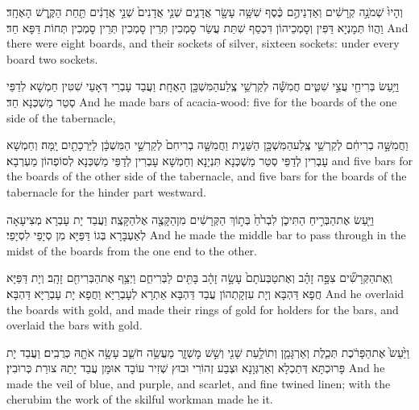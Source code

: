 {וְהָיוּ֙ שְׁמֹנָ֣ה קְרָשִׁ֔ים וְאַדְנֵיהֶ֣ם כֶּ֔סֶף שִׁשָּׁ֥ה עָשָׂ֖ר אֲדָנִ֑ים שְׁנֵ֤י אֲדָנִים֙ שְׁנֵ֣י אֲדָנִ֔ים תַּ֖חַת הַקֶּ֥רֶשׁ הָאֶחָֽד׃}
{וַהֲווֹ תְּמָנְיָא דַּפִּין וְסָמְכֵיהוֹן דִּכְסַף שִׁתַּת עֲשַׂר סָמְכִין תְּרֵין סָמְכִין תְּרֵין סָמְכִין תְּחוֹת דַּפָּא חַד׃}
{And there were eight boards, and their sockets of silver, sixteen sockets: under every board two sockets.}{}

{וַיַּ֥עַשׂ בְּרִיחֵ֖י עֲצֵ֣י שִׁטִּ֑ים חֲמִשָּׁ֕ה לְקַרְשֵׁ֥י צֶֽלַע\maqqaf הַמִּשְׁכָּ֖ן הָאֶחָֽת׃}
{וַעֲבַד עָבְרֵי דְּאָעֵי שִׁטִּין חַמְשָׁא לְדַפֵּי סְטַר מַשְׁכְּנָא חַד׃}
{And he made bars of acacia-wood: five for the boards of the one side of the tabernacle,}{}

{וַחֲמִשָּׁ֣ה בְרִיחִ֔ם לְקַרְשֵׁ֥י צֶֽלַע\maqqaf הַמִּשְׁכָּ֖ן הַשֵּׁנִ֑ית וַחֲמִשָּׁ֤ה בְרִיחִם֙ לְקַרְשֵׁ֣י הַמִּשְׁכָּ֔ן לַיַּרְכָתַ֖יִם יָֽמָּה׃}
{וְחַמְשָׁא עָבְרִין לְדַפֵּי סְטַר מַשְׁכְּנָא תִּנְיָנָא וְחַמְשָׁא עָבְרִין לְדַפֵּי מַשְׁכְּנָא לְסוֹפְהוֹן מַעְרְבָא׃}
{and five bars for the boards of the other side of the tabernacle, and five bars for the boards of the tabernacle for the hinder part westward.}{}

{וַיַּ֖עַשׂ אֶת\maqqaf הַבְּרִ֣יחַ הַתִּיכֹ֑ן לִבְרֹ֙חַ֙ בְּת֣וֹךְ הַקְּרָשִׁ֔ים מִן\maqqaf הַקָּצֶ֖ה אֶל\maqqaf הַקָּצֶֽה׃}
{וַעֲבַד יָת עָבְרָא מְצִיעָאָה לְאַעְבָּרָא בְּגוֹ דַּפַּיָּא מִן סְיָפֵי לִסְיָפֵי׃}
{And he made the middle bar to pass through in the midst of the boards from the one end to the other.}{}

{וְֽאֶת\maqqaf הַקְּרָשִׁ֞ים צִפָּ֣ה זָהָ֗ב וְאֶת\maqqaf טַבְּעֹתָם֙ עָשָׂ֣ה זָהָ֔ב בָּתִּ֖ים לַבְּרִיחִ֑ם וַיְצַ֥ף אֶת\maqqaf הַבְּרִיחִ֖ם זָהָֽב׃}
{וְיָת דַּפַּיָּא חֲפָא דַּהְבָּא וְיָת עִזְקָתְהוֹן עֲבַד דַּהְבָּא אַתְרָא לְעָבְרַיָּא וַחֲפָא יָת עָבְרַיָּא דַּהְבָּא׃}
{And he overlaid the boards with gold, and made their rings of gold for holders for the bars, and overlaid the bars with gold.}{}

{וַיַּ֙עַשׂ֙ אֶת\maqqaf הַפָּרֹ֔כֶת תְּכֵ֧לֶת וְאַרְגָּמָ֛ן וְתוֹלַ֥עַת שָׁנִ֖י וְשֵׁ֣שׁ מׇשְׁזָ֑ר מַעֲשֵׂ֥ה חֹשֵׁ֛ב עָשָׂ֥ה אֹתָ֖הּ כְּרֻבִֽים׃}
{וַעֲבַד יָת פָּרוּכְתָּא דְּתַכְלָא וְאַרְגְּוָנָא וּצְבַע זְהוֹרִי וּבוּץ שְׁזִיר עוֹבָד אוּמָּן עֲבַד יָתַהּ צוּרַת כְּרוּבִין׃}
{And he made the veil of blue, and purple, and scarlet, and fine twined linen; with the cherubim the work of the skilful workman made he it.}{}


